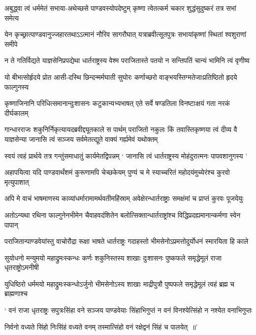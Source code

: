 \twolineshloka
{अबुद्ध्वा त्वं धर्ममेतं सभाया-अथेच्छसे पाण्डवस्योपदेष्टुम्}
{कृष्णा त्वेतत्कर्म चकार शुद्धंसुदुष्करं तत्र सभां समेत्य}


\twolineshloka
{येन कृच्छ्रात्पाण्डवानुज्जहारतथाऽऽत्मानं नौरिव सागरौघात्}
{यत्राब्रवीत्सूतपुत्रः सभायांकृष्णां स्थितां श्वशुराणां समीपे}


\twolineshloka
{न ते गतिर्विद्यते याज्ञसेनिप्रपद्येथा धार्तराष्ट्रस्य वेश्म}
{पराजितास्ते पतयो न सन्तिपतिं चान्यं भामिनि त्वं वृणीष्व}


\twolineshloka
{यो बीभत्सोर्हृदये प्रोत आसी-दस्थि छिन्दन्मर्मघाती सुघोरः}
{कर्णाच्छरो वाङ्भयस्तिग्मतेजाःप्रतिष्ठितो हृदये फाल्गुनस्य}


\twolineshloka
{कृष्णाजिनानि परिधित्समानान्दुःशासनः कटुकान्यभ्यभाषत्}
{एते सर्वे षण्डतिला विनष्टाःक्षयं गता नरकं दीर्घकालम्}


\threelineshloka
{गान्धारराजः शकुनिर्निकृत्यायदब्रवीद्द्यूतकाले स पार्थम्}
{पराजितो नकुलः किं तवास्तिकृष्णया त्वं दीव्य वै याज्ञसेन्या}
{जानासि त्वं सञ्जय सर्वमेतत्द्यूते वाक्यं गर्ह्यमेवं यथोक्तम्}


\twolineshloka
{स्वयं त्वहं प्रार्थये तत्र गन्तुंसमाधातुं कार्यमेतद्विपन्नम्}
{` जानासि त्वं धार्तराष्ट्रस्य मोहंदुरात्मनः पापवशानुगस्य '}


\twolineshloka
{अहापयित्वा यदि पाण्डवार्थंशमं कुरूणामपि चेच्छकेयम्}
{पुण्यं च मे स्याच्चरितं महोदयंमुच्येरंश्च कुरवो मृत्युपाशात्}


\twolineshloka
{अपि मे वाचं भाषमाणस्य काव्यांधर्मारामामर्थवतीमहिंस्राम्}
{अवेक्षेरन्धार्तराष्ट्राः समक्षंमां च प्राप्तं कुरवः पूजयेयुः}


\twolineshloka
{अतोऽन्यथा रथिना फाल्गुनेनभीमेन चैवाहवदंशितेन}
{बलोत्सिक्तान्धार्तराष्ट्रांश्च विद्धिप्रदह्यमानान्कर्मणा स्वेन पापान्}


\twolineshloka
{पराजितान्पाण्डवेयांस्तु वाचोरौद्रा रूक्षा भाषते धार्तराष्ट्रः}
{गदाहस्तो भीमसेनोऽप्रमत्तोदुर्योधनं स्मारयिता हि काले}


\twolineshloka
{सुयोधनो मन्युमयो महाद्रुमःस्कन्धः कर्णः शकुनिस्तस्य शाखाः}
{दुःशासनः पुष्कफले समृद्धेमूलं राजा धृतराष्ट्रोऽमनीषी}


\twolineshloka
{युधिष्ठिरो धर्ममयो महाद्रुमःस्कन्धोऽर्जुनो भीमसेनोऽस्य शाखाः}
{माद्रीपुत्रौ पुष्पफले समृद्धेमूलं त्वहं ब्रह्म च ब्राह्मणाश्च}


\twolineshloka
{` वनं राजा धृतराष्ट्रः सपुत्रःसिंहा वने सञ्जय पाण्डवेयाः}
{सिंहाभिगुप्तं न वनं विनश्येत्सिंहो न नश्येत वनाभिगुप्तः}


\twolineshloka
{निर्वनो वध्यते सिंहो निःसिंहं वध्यते वनम्}
{तस्मात्सिंहो वनं रक्षेद्वनं सिंहं च पालयेत् ॥'}


